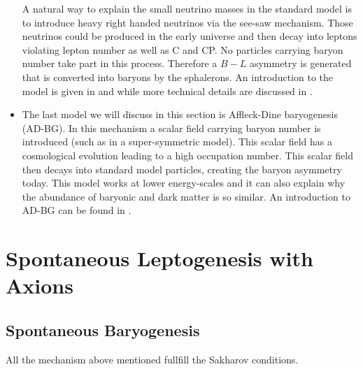 \documentclass[13pt,a4paper,twoside,titlepage]{article}
\begin{document}
\begin{itemize}
    A natural way to explain the small neutrino masses in the standard model is to introduce heavy right handed neutrinos via the see-saw mechanism.
    Those neutrinos could be produced in the early universe and then decay into leptons violating lepton number as well as C and CP. No particles carrying baryon
    number take part in this process.
    Therefore a $B - L$ asymmetry is generated that is converted into baryons by the sphalerons. An introduction to the model is given in \cite{Leptogenesis_review_doi:10.1146/annurev.nucl.55.090704.151558} and \cite{Leptogenesis_Buchmüller:2014} while more technical details are discussed in \cite{Pedestrians_Buchm_ller_2005}.
    \item The last model we will discuss in this section is Affleck-Dine baryogenesis (AD-BG).
    In this mechanism a scalar field carrying baryon number is introduced (such as in a super-symmetric model).
    This scalar field has a cosmological evolution leading to a high occupation number. This scalar field then decays into standard model particles, creating the baryon asymmetry today.
    This model works at lower energy-scales and it can also explain why the abundance of baryonic and dark matter is so similar. An introduction to AD-BG can be found in \cite[Part III]{Dine_2003_Bayrogenesis}.
\end{itemize}


\section{Spontaneous Leptogenesis with Axions}

\subsection{Spontaneous Baryogenesis}
\label{sec:spontaneour_bayrogenesis}

All the mechanism above mentioned fullfill the Sakharov conditions.
\end{document}

